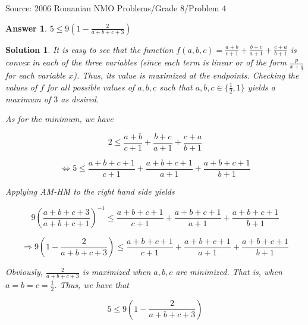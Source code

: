 \documentclass[12pt]{article}
\newtheorem*{answer*}{Answer}
\newtheorem*{solution*}{Solution}
\begin{document}
Source: 2006 Romanian NMO Problems/Grade 8/Problem 4\\

\begin{answer*}
$5\le 9\left(1-\frac{2}{a+b+c+3}\right)$
\end{answer*}

\begin{solution*}
It is easy to see that the function $f(a,b,c)=\frac{a+b}{c+1}+\frac{b+c}{a+1}+\frac{c+a}{b+1}$ is convex in each of the three variables (since each term is linear or of the form $\frac{p}{x+q}$ for each variable $x$).  Thus, its value is maximized at the endpoints.  Checking the values of $f$ for all possible values of $a,b,c$ such that $a,b,c\in \{\frac{1}{2},1\}$ yields a maximum of $3$ as desired.  

As for the minimum, we have

$$2\le \frac{a+b}{c+1}+\frac{b+c}{a+1}+\frac{c+a}{b+1}$$

$$\Leftrightarrow 5\le \frac{a+b+c+1}{c+1}+\frac{a+b+c+1}{a+1}+\frac{a+b+c+1}{b+1}$$

Applying AM-HM to the right hand side yields

$$9\left(\frac{a+b+c+3}{a+b+c+1}\right)^{-1}\le\frac{a+b+c+1}{c+1}+\frac{a+b+c+1}{a+1}+\frac{a+b+c+1}{b+1}$$

$$\Rightarrow 9\left(1-\frac{2}{a+b+c+3}\right)\le\frac{a+b+c+1}{c+1}+\frac{a+b+c+1}{a+1}+\frac{a+b+c+1}{b+1}$$

Obviously, $\frac{2}{a+b+c+3}$ is maximized when $a,b,c$ are minimized.  That is, when $a=b=c=\frac{1}{2}$.  Thus, we have that 

$$5\le 9\left(1-\frac{2}{a+b+c+3}\right)$$
\end{solution*}
\end{document}

